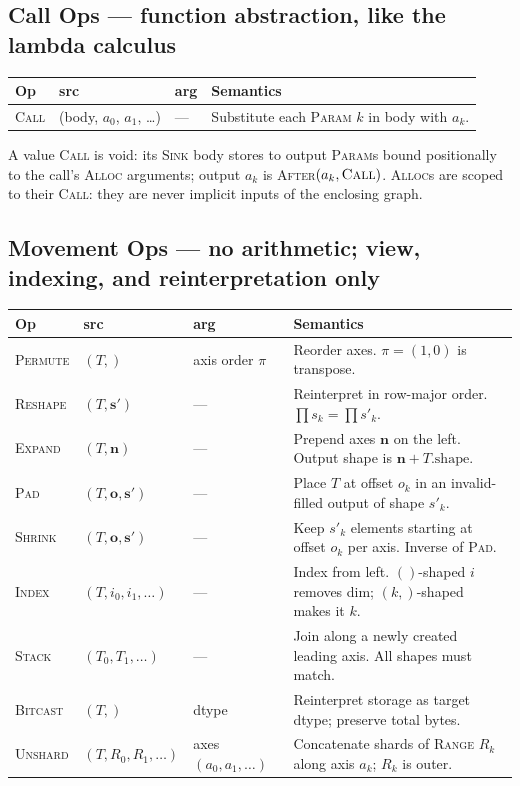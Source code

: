 \documentclass[10pt,letterpaper]{article}
\newcommand{\op}[1]{\textsc{#1}}
\begin{document}
\subsection*{{\color{callblue}Call Ops} \normalfont\small--- function abstraction, like the lambda calculus}

\begin{tabular}{@{}l l l l@{}}
\toprule
\textbf{Op} & \textbf{src} & \textbf{arg} & \textbf{Semantics} \\
\midrule
\op{Call} & (body, $a_0$, $a_1$, \ldots) & --- & Substitute each \op{Param} $k$ in body with $a_k$. \\
\bottomrule
\end{tabular}

\smallskip
A value \op{Call} is void: its \op{Sink} body stores to output \op{Param}s bound positionally to the call's \op{Alloc} arguments; output $a_k$ is \op{After}$(a_k, \op{Call})$. \op{Alloc}s are scoped to their \op{Call}: they are never implicit inputs of the enclosing graph.

\subsection*{{\color{movgreen}Movement Ops} \normalfont\small--- no arithmetic; view, indexing, and reinterpretation only}

\begin{tabular}{@{}l l l l@{}}
\toprule
\textbf{Op} & \textbf{src} & \textbf{arg} & \textbf{Semantics} \\
\midrule
\op{Permute} & $(T,)$ & axis order $\pi$ & Reorder axes. $\pi = (1,0)$ is transpose. \\
\op{Reshape} & $(T, \mathbf{s'})$ & --- & Reinterpret in row-major order. $\prod s_k = \prod s'_k$. \\
\op{Expand} & $(T, \mathbf{n})$ & --- & Prepend axes $\mathbf{n}$ on the left. Output shape is $\mathbf{n} + T.\mathrm{shape}$. \\
\op{Pad} & $(T, \mathbf{o}, \mathbf{s'})$ & --- & Place $T$ at offset $o_k$ in an invalid-filled output of shape $s'_k$. \\
\op{Shrink} & $(T, \mathbf{o}, \mathbf{s'})$ & --- & Keep $s'_k$ elements starting at offset $o_k$ per axis. Inverse of \op{Pad}. \\
\op{Index} & $(T, i_0, i_1, \ldots)$ & --- & Index from left. $()$-shaped $i$ removes dim; $(k,)$-shaped makes it $k$. \\
\op{Stack} & $(T_0, T_1, \ldots)$ & --- & Join along a newly created leading axis. All shapes must match. \\
\op{Bitcast} & $(T,)$ & dtype & Reinterpret storage as target dtype; preserve total bytes. \\
\op{Unshard} & $(T, R_0, R_1, \ldots)$ & axes $(a_0, a_1, \ldots)$ & Concatenate shards of \op{Range} $R_k$ along axis $a_k$; $R_k$ is outer. \\
\bottomrule
\end{tabular}
\end{document}
